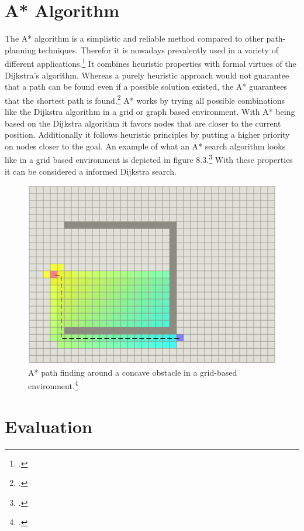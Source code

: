 \section{A* Algorithm}

The A* algorithm is a simplistic and reliable method compared to other path-planning techniques. Therefor it is nowadays prevalently used in a variety of different applications.\footcite{Zammit2018}\newline
It combines heuristic properties with formal virtues of the Dijkstra's algorithm. Whereas a purely heuristic approach would not guarantee that a path can be found even if a possible solution existed, the A* guarantees that the shortest path is found.\footcite{Sathyaraj2008}
A* works by trying all possible combinations like the Dijkstra algorithm in a grid or graph based environment. With A* being based on the Dijkstra algorithm it favors nodes that are closer to the current position. Additionally it follows heuristic principles by putting a higher priority on nodes closer to the goal. An example of what an A* search algorithm looks like in a grid based environment is depicted in figure 8.3.\footcite{standfordAStarComparison1997}\newline
With these properties it can be considered a informed Dijkstra search.
  
\begin{figure}[h]
	\centering
	\includegraphics[width=0.7\linewidth]{img/AStarExample}
	\caption{A* path finding around a concave obstacle in a grid-based environment.\footcite{standfordAStarComparison1997}}
	\label{fig:path_planning_Astar}
\end{figure}

\section{Evaluation}

